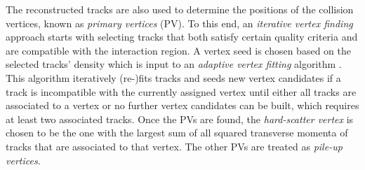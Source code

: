 The reconstructed tracks are also used to determine the positions of the collision vertices, known as \emph{primary vertices} (PV). To this end, an \emph{iterative vertex finding} approach \cite{PERF-2015-01} starts with selecting tracks that both satisfy certain quality criteria and are compatible with the interaction region. A vertex seed is chosen based on the selected tracks' density which is input to an \emph{adaptive vertex fitting} algorithm . 
This algorithm iteratively (re-)fits tracks and seeds new vertex candidates if a track is incompatible with the currently assigned vertex until either all tracks are associated to a vertex or no further vertex candidates can be built, which requires at least two associated tracks.
Once the PVs are found, the \emph{hard-scatter vertex} is chosen to be the one with the largest sum of all squared transverse momenta of tracks that are associated to that vertex. The other PVs are treated as \emph{pile-up vertices}.






